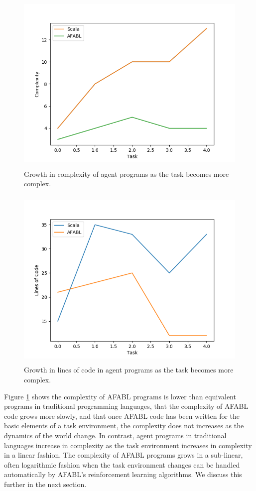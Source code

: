 \begin{figure}[h!]
\begin{center}
  \includegraphics[height=3.5in]{complexity.png}
\end{center}
\caption{Growth in complexity of agent programs as the task becomes more complex.}
\label{fig:complexity}
\end{figure}

\begin{figure}[h!]
\begin{center}
  \includegraphics[height=3.5in]{loc.png}
\end{center}
\caption{Growth in lines of code in agent programs as the task becomes more complex.}
\label{fig:loc}
\end{figure}

Figure \ref{fig:complexity} shows the complexity of AFABL programs is lower than equivalent programs in traditional programming languages, that the complexity of AFABL code grows more slowly, and that once AFABL code has been written for the basic elements of a task environment, the complexity does not increases as the dynamics of the world change. In contrast, agent programs in traditional languages increase in complexity as the task environment increases in complexity in a linear fashion. The complexity of AFABL programs grows in a sub-linear, often logarithmic fashion when the task environment changes can be handled automatically by AFABL's reinforcement learning algorithms. We discuss this further in the next section.

